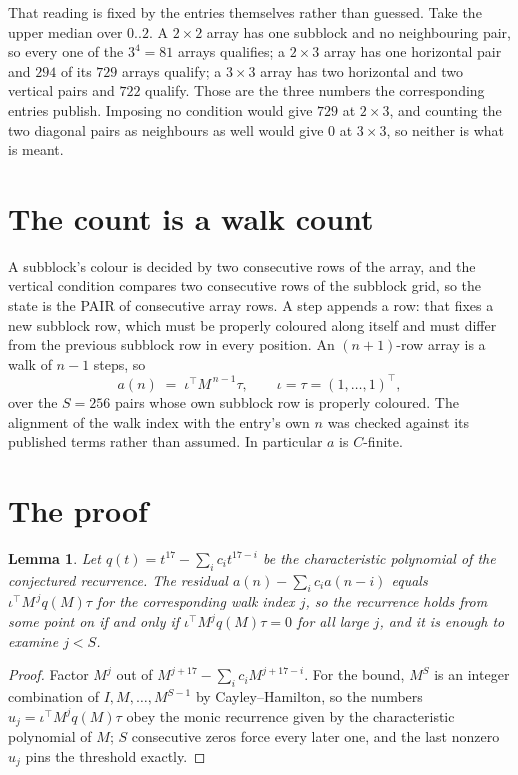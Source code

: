 \documentclass[11pt,a4paper]{article}
\theoremstyle{plain}
\newtheorem{lemma}[theorem]{Lemma}
\theoremstyle{definition}
\begin{document}
That reading is fixed by the entries themselves rather than guessed. Take the upper median
over $0..2$. A $2\times2$ array has one subblock and no neighbouring pair, so every one of the
$3^4=81$ arrays qualifies; a $2\times3$ array has one horizontal pair and $294$ of its $729$
arrays qualify; a $3\times3$ array has two horizontal and two vertical pairs and $722$
qualify. Those are the three numbers the corresponding entries publish. Imposing no condition
would give $729$ at $2\times3$, and counting the two diagonal pairs as neighbours as well
would give $0$ at $3\times3$, so neither is what is meant.

\section{The count is a walk count}

A subblock's colour is decided by two consecutive rows of the array, and
the vertical condition compares two consecutive rows of the subblock grid, so the state is the
PAIR of consecutive array rows. A step appends a row: that fixes a new subblock row, which
must be properly coloured along itself and must differ from the previous subblock row in every
position. An $(n+1)$-row array is a walk of $n-1$ steps, so
\[
a(n)\;=\;\iota^{\!\top}M^{\,n-1}\tau,\qquad\iota=\tau=(1,\dots,1)^{\!\top},
\]
over the $S=256$ pairs whose own subblock row is properly coloured.
The alignment of the walk index with the entry's own $n$ was checked against its published
terms rather than assumed. In particular $a$ is $C$-finite.

\section{The proof}

\begin{lemma}\label{lem:crit}
Let $q(t)=t^{17}-\sum_i c_it^{17-i}$ be the characteristic polynomial of the
conjectured recurrence. The residual $a(n)-\sum_ic_ia(n-i)$ equals
$\iota^{\!\top}M^{\,j}q(M)\tau$ for the corresponding walk index $j$, so the recurrence
holds from some point on if and only if $\iota^{\!\top}M^{j}q(M)\tau=0$ for all large $j$,
and it is enough to examine $j<S$.
\end{lemma}

\begin{proof}
Factor $M^{j}$ out of $M^{j+17}-\sum_ic_iM^{j+17-i}$. For the bound, $M^{S}$
is an integer combination of $I,M,\dots,M^{S-1}$ by Cayley--Hamilton, so the numbers
$u_j=\iota^{\!\top}M^{j}q(M)\tau$ obey the monic recurrence given by the characteristic
polynomial of $M$; $S$ consecutive zeros force every later one, and the last nonzero $u_j$
pins the threshold exactly.
\end{proof}
\end{document}
